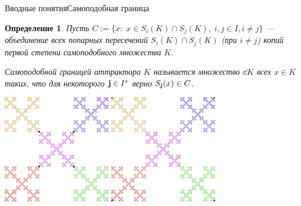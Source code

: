 \documentclass[aspectratio=1610, 10pt, notheorems]{beamer}
\newtheorem{definition}  {Определение}
\begin{document}
\begin{frame}{Вводные понятия}{Самоподобная граница}
\begin{definition}
Пусть $C:=\{x:\; x\in S_i(K)\cap S_j(K),\; i,j \in I, i\neq j\}$ ---  объединение всех попарных пересечений $S_i(K)\cap S_j(K)$ (при $i\neq j$) копий первой степени самоподобного множества $K$.

{\em Самоподобной границей} аттрактора $K$ называется множество $\dd K$ всех $x\in K$ таких, что для некоторого ${\bf{j}}\in I^*$ верно $S_{\bf{j}}(x)\in C$.
\end{definition}
\qquad
\includegraphics[width=0.35\textwidth]{images/kvC.png}
\hfill
\includegraphics[width=0.35\textwidth]{images/kvD.png}
\qquad\qquad
\end{frame}
\end{document}
